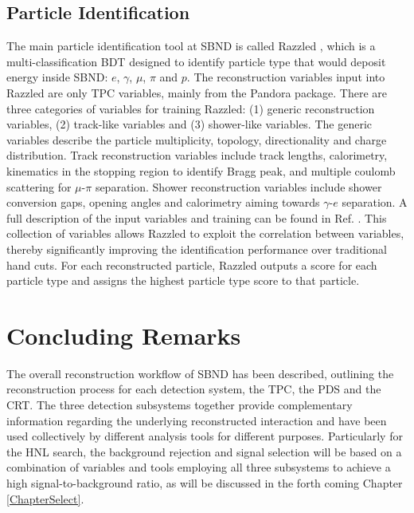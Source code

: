\subsection{Particle Identification}
\label{sec:razzled}

The main particle identification tool at SBND is called Razzled \cite{razzled}, which is a multi-classification BDT designed to identify particle type that would deposit energy inside SBND: $e$, $\gamma$, $\mu$, $\pi$ and $p$.
The reconstruction variables input into Razzled are only TPC variables, mainly from the Pandora package.
There are three categories of variables for training Razzled: (1) generic reconstruction variables, (2) track-like variables and (3) shower-like variables.
The generic variables describe the particle multiplicity, topology, directionality and charge distribution.
Track reconstruction variables include track lengths, calorimetry, kinematics in the stopping region to identify Bragg peak, and multiple coulomb scattering for $\mu$-$\pi$ separation.
Shower reconstruction variables include shower conversion gaps, opening angles and calorimetry aiming towards $\gamma$-$e$ separation.
A full description of the input variables and training can be found in Ref. \cite{EdPhD}.
This collection of variables allows Razzled to exploit the correlation between variables, thereby significantly improving the identification performance over traditional hand cuts.
For each reconstructed particle, Razzled outputs a score for each particle type and assigns the highest particle type score to that particle.

\section{Concluding Remarks}
\label{sec:reco_concluding_remarks}

The overall reconstruction workflow of SBND has been described, outlining the reconstruction process for each detection system, the TPC, the PDS and the CRT.
The three detection subsystems together provide complementary information regarding the underlying reconstructed interaction and have been used collectively by different analysis tools for different purposes.
Particularly for the HNL search, the background rejection and signal selection will be based on a combination of variables and tools employing all three subsystems to achieve a high signal-to-background ratio, as will be discussed in the forth coming Chapter \ref{ChapterSelect}.
